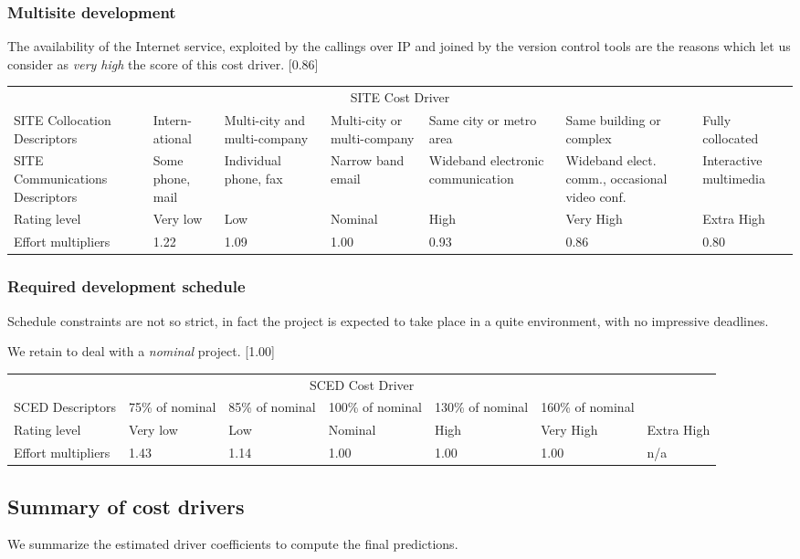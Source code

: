 \documentclass{scrreprt}
\newcommand{\costdescriptors}[7]{
	#1 & #2 & #3 & #4 & #5 & #6 & #7\\
}
\newcommand{\ratinglevel}[6]{
	Rating level & #1 & #2 & #3 & #4 & #5 & #6 \\\hline
}
\newcommand{\effortmultipliers}[6]{
	Effort multipliers & #1 & #2 & #3 & #4 & #5 & #6 \\\hline
}
\newenvironment{costdriverstable}[1]{
	\setlength{\LTleft}{-40pt}
	\begin{longtable}{|p{\dimexpr.16\textwidth}|p{\dimexpr.14\textwidth}|p{\dimexpr.14\textwidth}|p{\dimexpr.14\textwidth}|p{\dimexpr.14\textwidth}|p{\dimexpr.14\textwidth}|p{\dimexpr.14\textwidth}|}
	\hline
	\multicolumn{7}{|c|}{{#1}}\\\hhline{|=======|}
}{
	\hline\end{longtable}
}
\begin{document}
\subsubsection{Multisite development}

The availability of the Internet service, exploited by the callings over IP and joined by the version control tools are the reasons which let us consider as \emph{very high} the score of this cost driver. [0.86]
	
		\begin{costdriverstable}{SITE Cost Driver}
		\costdescriptors{SITE Collocation Descriptors}{Intern-ational}{Multi-city and multi-company}{Multi-city or multi-company}{Same city or metro area}{Same building or complex}{Fully collocated}
		\costdescriptors{SITE Communications Descriptors}{Some phone, mail}{Individual phone, fax}{Narrow band email}{Wideband electronic communication}{Wideband elect. comm., occasional video conf.}{Interactive multimedia}\hline
		\ratinglevel{Very low}{Low}{Nominal}{High}{Very High}{Extra High}
		\effortmultipliers{1.22}{1.09}{1.00}{0.93}{\cellcolor[gray]{0.75}0.86}{0.80}		
	\end{costdriverstable}
	
\subsubsection{Required development schedule}
Schedule constraints are not so strict, in fact the project is expected to take place in a quite environment, with no impressive deadlines.

We retain to deal with a \emph{nominal} project. [1.00]


		\begin{costdriverstable}{SCED Cost Driver}
		\costdescriptors{SCED Descriptors}{75\% of nominal}{85\% of nominal}{100\% of nominal}{130\% of nominal}{160\% of nominal}{}\hline
		\ratinglevel{Very low}{Low}{Nominal}{High}{Very High}{Extra High}
		\effortmultipliers{1.43}{1.14}{\cellcolor[gray]{0.75}1.00}{1.00}{1.00}{n/a}	
	\end{costdriverstable}
	
	
\subsection{Summary of cost drivers}
We summarize the estimated driver coefficients to compute the final predictions.
\end{document}
